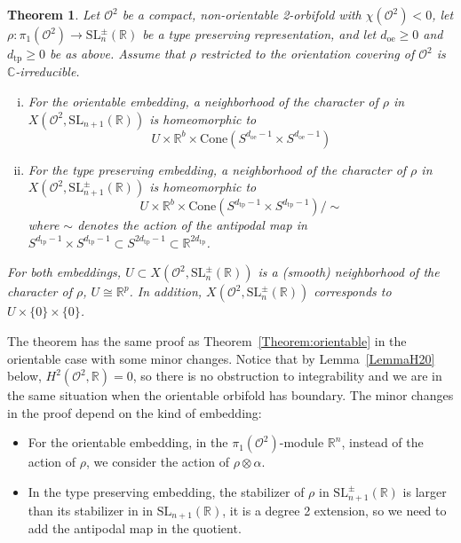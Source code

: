 \documentclass[a4paper,11pt]{article}
\newtheorem{Theorem}{Theorem}[section]
\begin{document}
\begin{Theorem}
 \label{Theorem:nonorientable}
Let $\mathcal O^2$ be a compact, non-orientable 2-orbifold with $\chi(\mathcal O^2)<0$, let
$\rho\colon\pi_1(\mathcal O^2)\to \mathrm{SL}^\pm_n(\mathbb R)$ be a type preserving  representation, and let
$d_{\mathrm{oe}}\geq 0 $ and $d_{\mathrm{tp}}\geq 0$  be as above. 
Assume that $\rho$ restricted to the orientation covering of $\mathcal O^2$ 
is $\mathbb C$-irreducible.
\begin{enumerate}[(i)]
 \item For the orientable embedding, a neighborhood of the character of $\rho$ in
 $ X(\mathcal O^2, \mathrm{SL}_{n+1}(\mathbb R))$ is
 homeomorphic to 
 $$
 U\times \mathbb R^b\times  \mathrm{Cone}( S^{d_{\mathrm{oe}}-1}\times S^{d_{\mathrm{oe}}-1})
 $$
 \item For the type preserving embedding, a neighborhood of the character of $\rho$ in  
 $ X(\mathcal O^2, \mathrm{SL}^{\pm }_{n+1}(\mathbb R))$ is
 homeomorphic to 
 $$
 U\times \mathbb R^b\times  \mathrm{Cone}( S^{d_{\mathrm{tp}}-1}\times S^{d_{\mathrm{tp}}-1})/\sim
 $$
 where $\sim$ denotes the action of the antipodal map in $S^{d_{\mathrm{tp}}-1}\times S^{d_{\mathrm{tp}}-1}\subset 
 S^{2 d_{\mathrm{tp}}-1}\subset \mathbb R^{2 d_{\mathrm{tp}}}$.
\end{enumerate}
For both embeddings, 
 $U\subset X(\mathcal O^2, \mathrm{SL}^\pm_n(\mathbb R) ) $ is a (smooth) neighborhood 
 of the character of $\rho$, $U\cong \mathbb R^p$.
 In addition,  $X(\mathcal O^2, \mathrm{SL}^\pm_n(\mathbb R) ) $
 corresponds to $U\times\{0\}\times\{0\}$.
\end{Theorem}


The theorem has the same proof as  
Theorem~\ref{Theorem:orientable} in the orientable case with some minor changes.
Notice that by Lemma~\ref{LemmaH20} below,
$H^2(\mathcal O^2,\mathbb R)=0$, so there is no obstruction to integrability and we are
in the same situation when the orientable orbifold has boundary.
The minor changes in the proof depend on the kind of embedding:
\begin{itemize}
 \item  For the orientable embedding, in
the $\pi_1(\mathcal O^2)$-module $\mathbb R^n$, instead of the action of
$\rho$, we consider the action of $\rho\otimes\alpha$.
\item
 In the type preserving embedding, the stabilizer of $\rho$ in
 $\mathrm{SL}^{\pm }_{n+1} (\mathbb R)$ is larger than its stabilizer in
 in  $\mathrm{SL}_{n+1}(\mathbb R)$, it is a degree 2 extension,
 so we need to add the antipodal map in the quotient.
\end{itemize}
\end{document}
